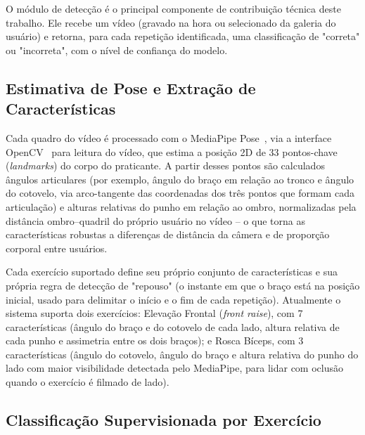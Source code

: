 \documentclass[12pt]{article}
\begin{document}
O módulo de detecção é o principal componente de contribuição técnica
deste trabalho. Ele recebe um vídeo (gravado na hora ou selecionado da
galeria do usuário) e retorna, para cada repetição identificada, uma
classificação de "correta" ou "incorreta", com o nível de confiança do
modelo.

\subsection{Estimativa de Pose e Extração de Características}

Cada quadro do vídeo é processado com o MediaPipe
Pose~\cite{lugaresi2019mediapipe}, via a interface OpenCV~\cite{bradski2000opencv}
para leitura do vídeo, que estima a posição 2D de 33 pontos-chave (\textit{landmarks})
do corpo do praticante. A partir desses pontos são calculados ângulos
articulares (por exemplo, ângulo do braço em relação ao tronco e ângulo do
cotovelo, via arco-tangente das coordenadas dos três pontos que formam
cada articulação) e alturas relativas do punho em relação ao ombro,
normalizadas pela distância ombro--quadril do próprio usuário no vídeo --
o que torna as características robustas a diferenças de distância da
câmera e de proporção corporal entre usuários.

Cada exercício suportado define seu próprio conjunto de características e
sua própria regra de detecção de "repouso" (o instante em que o braço está
na posição inicial, usado para delimitar o início e o fim de cada
repetição). Atualmente o sistema suporta dois exercícios: Elevação Frontal
(\textit{front raise}), com 7 características (ângulo do braço e do
cotovelo de cada lado, altura relativa de cada punho e assimetria entre os
dois braços); e Rosca Bíceps, com 3 características (ângulo do cotovelo,
ângulo do braço e altura relativa do punho do lado com maior visibilidade
detectada pelo MediaPipe, para lidar com oclusão quando o exercício é
filmado de lado).

\subsection{Classificação Supervisionada por Exercício}
\end{document}
